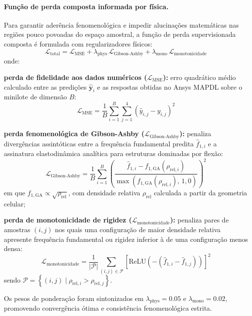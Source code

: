 \paragraph{Função de perda composta informada por física.}
\label{par:perda}
Para garantir aderência fenomenológica e impedir alucinações matemáticas nas regiões pouco povoadas do espaço amostral, a função de perda supervisionada composta é formulada com regularizadores físicos:
\begin{equation}
  \mathcal{L}_{\text{total}} = \mathcal{L}_{\text{MSE}} + \lambda_{\text{phys}}\,\mathcal{L}_{\text{Gibson-Ashby}} + \lambda_{\text{mono}}\,\mathcal{L}_{\text{monotonicidade}}
  \label{eq:perda-total}
\end{equation}
onde:
\begin{alineas}
  \item \textbf{perda de fidelidade aos dados numéricos ($\mathcal{L}_{\text{MSE}}$):} erro quadrático médio calculado entre as predições $\hat{\mathbf{y}}_i$ e as respostas obtidas no Ansys MAPDL sobre o minilote de dimensão $B$:
  \begin{equation}
    \mathcal{L}_{\text{MSE}} = \frac{1}{B} \sum_{i=1}^{B} \sum_{j=1}^{4} \left( \hat{y}_{i,j} - y_{i,j} \right)^{2}
    \label{eq:mse}
  \end{equation}
  \item \textbf{perda fenomenológica de Gibson-Ashby ($\mathcal{L}_{\text{Gibson-Ashby}}$):} penaliza divergências assintóticas entre a frequência fundamental predita $\hat{f}_{1,i}$ e a assinatura elastodinâmica analítica para estruturas dominadas por flexão:
  \begin{equation}
    \mathcal{L}_{\text{Gibson-Ashby}} = \frac{1}{B} \sum_{i=1}^{B} \left( \frac{\hat{f}_{1,i} - f_{1,\text{GA}}(\rho_{\text{rel},i})}{\max\!\left( f_{1,\text{GA}}(\rho_{\text{rel},i}),\, 1{,}0 \right)} \right)^{2}
    \label{eq:ga}
  \end{equation}
  em que $f_{1,\text{GA}} \propto \sqrt{\rho_{\text{rel}}}$, com densidade relativa $\rho_{\text{rel}}$ calculada a partir da geometria celular;
  \item \textbf{perda de monotonicidade de rigidez ($\mathcal{L}_{\text{monotonicidade}}$):} penaliza pares de amostras $(i,j)$ nos quais uma configuração de maior densidade relativa apresente frequência fundamental ou rigidez inferior à de uma configuração menos densa:
  \begin{equation}
    \mathcal{L}_{\text{monotonicidade}} = \frac{1}{|\mathcal{P}|} \sum_{(i,j) \in \mathcal{P}} \left[ \mathrm{ReLU}\!\left( -\left( \hat{f}_{1,i} - \hat{f}_{1,j} \right) \right) \right]^{2}
    \label{eq:mono}
  \end{equation}
  sendo $\mathcal{P} = \left\{ (i,j) \mid \rho_{\text{rel},i} > \rho_{\text{rel},j} \right\}$.
\end{alineas}
Os pesos de ponderação foram sintonizados em $\lambda_{\text{phys}} = \num{0.05}$ e $\lambda_{\text{mono}} = \num{0.02}$, promovendo convergência ótima e consistência fenomenológica estrita.


